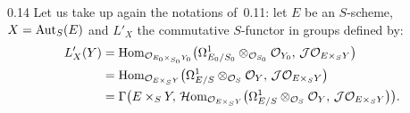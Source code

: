 \begin{remark}{0.14}
\label{III.0.14}
{\renewcommand{\thefootnote}{(30)}}
Let us take up again the notations of~0.11: let \(E\) be an \(S\)-scheme,
\(X=\operatorname{Aut}_{S}(E)\) and \(L'_{X}\) the commutative \(S\)-functor in groups defined
by:
\begin{align*}
L'_{X}(Y)
&=
\operatorname{Hom}_{\mathcal{O}_{E_{0}\times_{S_{0}}Y_{0}}}
  \bigl(\Omega^{1}_{E_{0}/S_{0}}
    \otimes_{\mathcal{O}_{S_{0}}}\mathcal{O}_{Y_{0}},\,
  \mathcal{J}\mathcal{O}_{E\times_{S}Y}\bigr) \\
&=
\operatorname{Hom}_{\mathcal{O}_{E\times_{S}Y}}
  \bigl(\Omega^{1}_{E/S}\otimes_{\mathcal{O}_{S}}\mathcal{O}_{Y},\,
  \mathcal{J}\mathcal{O}_{E\times_{S}Y}\bigr) \\
&=
\Gamma\bigl(E\times_{S}Y,\,
  \mathcal{H}\mathrm{om}_{\mathcal{O}_{E\times_{S}Y}}
    \bigl(\Omega^{1}_{E/S}\otimes_{\mathcal{O}_{S}}\mathcal{O}_{Y},\,
    \mathcal{J}\mathcal{O}_{E\times_{S}Y}\bigr)\bigr).
\end{align*}
\end{remark}
